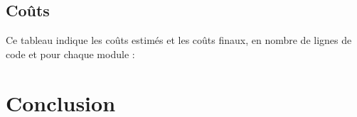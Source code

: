 		\subsection{Coûts}
		Ce tableau indique les coûts estimés et les coûts finaux, en nombre de lignes de code et pour chaque module :
	
	
	
	\section*{Conclusion}
		

